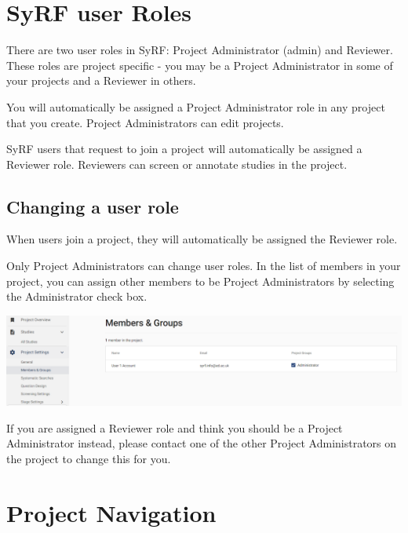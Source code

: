 \documentclass[
]{book}
\begin{document}
\hypertarget{roles}{%
\chapter{SyRF user Roles}\label{roles}}

There are two user roles in SyRF: Project Administrator (admin) and Reviewer. These roles are project specific - you may be a Project Administrator in some of your projects and a Reviewer in others.

You will automatically be assigned a Project Administrator role in any project that you create. Project Administrators can edit projects.

SyRF users that request to join a project will automatically be assigned a Reviewer role. Reviewers can screen or annotate studies in the project.

\hypertarget{changing-a-user-role}{%
\section{Changing a user role}\label{changing-a-user-role}}

When users join a project, they will automatically be assigned the Reviewer role.

Only Project Administrators can change user roles. In the list of members in your project, you can assign other members to be Project Administrators by selecting the Administrator check box.

\includegraphics[width=1\linewidth]{figs/Fig_Change_user_role}

If you are assigned a Reviewer role and think you should be a Project Administrator instead, please contact one of the other Project Administrators on the project to change this for you.

\hypertarget{nagivation}{%
\chapter{Project Navigation}\label{nagivation}}
\end{document}
